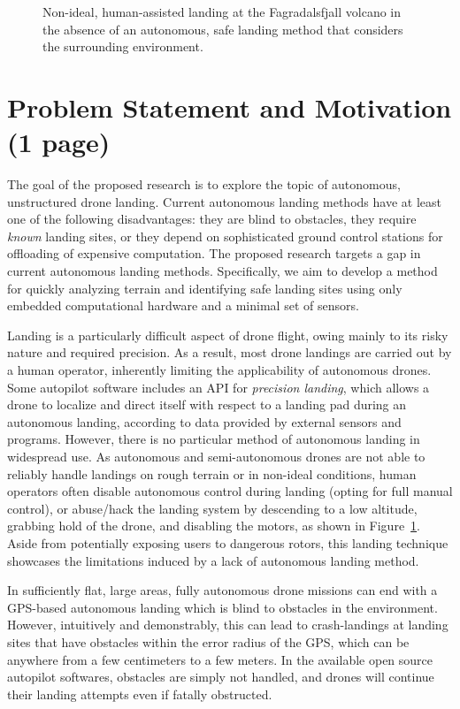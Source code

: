 \begin{figure}[ht]
    \centering
    \begin{minipage}{\wd0}
      \caption{Non-ideal, human-assisted landing at the Fagradalsfjall volcano in the absence of an autonomous, safe landing method that considers the surrounding environment.}
      \label{figure:hand_landing}
    \end{minipage}
\end{figure}

\section{Problem Statement and Motivation (1 page)}

The goal of the proposed research is to explore the topic of
autonomous, unstructured drone landing.
Current autonomous landing methods have at least one of the following disadvantages:
they are blind to obstacles,
they require \textit{known} landing sites,
or they depend on sophisticated ground control stations for offloading of expensive computation.
The proposed research targets a gap in current autonomous landing methods.
Specifically, we aim to develop a method for quickly analyzing terrain
and identifying safe landing sites using only embedded computational hardware
and a minimal set of sensors.

Landing is a particularly difficult aspect of drone flight,
owing mainly to its risky nature and required precision.
As a result, most drone landings are carried out by a human operator,
inherently limiting the applicability of autonomous drones.
Some autopilot software includes an API for \textit{precision landing},
which allows a drone to localize and direct itself with respect to a landing pad during an autonomous landing,
according to data provided by external sensors and programs.
However, there is no particular method of autonomous landing in widespread use.
As autonomous and semi-autonomous drones are not able to reliably handle landings
on rough terrain or in non-ideal conditions, human operators often disable
autonomous control during landing (opting for full manual control),
or abuse/hack the landing system by descending to a low altitude,
grabbing hold of the drone,
and disabling the motors,
as shown in Figure~\ref{figure:hand_landing}.
Aside from potentially exposing users to dangerous rotors,
this landing technique showcases the limitations induced by a lack of
autonomous landing method.

In sufficiently flat, large areas, fully autonomous drone missions can end with a GPS-based
autonomous landing which is blind to obstacles in the environment.
However,
intuitively and demonstrably,
this can lead to crash-landings at landing sites that have obstacles within
the error radius of the GPS,
which can be anywhere from a few centimeters to a few meters.
In the available open source autopilot softwares,
obstacles are simply not handled,
and drones will continue their landing attempts even if fatally obstructed.
